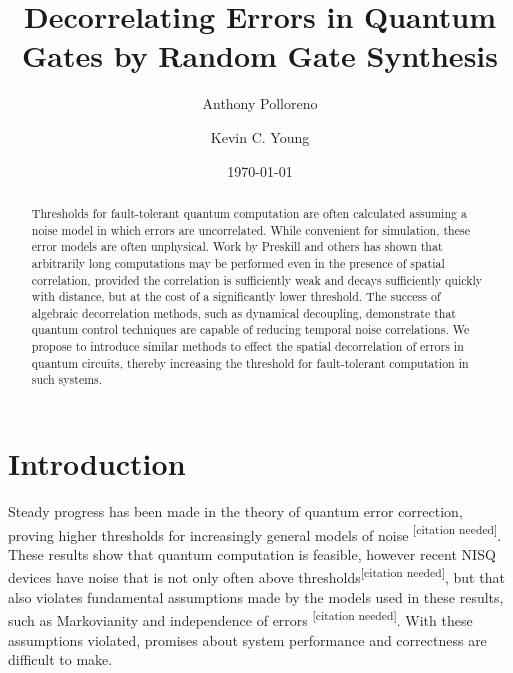 \documentclass[aps,nofootinbib,pra,notitlepage,twocolumn]{revtex4-1}
\newcommand{\needcite}{{\color{blue}\textsuperscript{[citation needed]}}}
\begin{document}
\title{Decorrelating Errors in Quantum Gates by Random Gate Synthesis}

\author{Anthony Polloreno}

\author{Kevin C. Young}

\date{\today}

\begin{abstract}
Thresholds for fault-tolerant quantum computation are often calculated assuming a noise model in which errors are uncorrelated. While convenient for simulation, these error models are often unphysical. Work by Preskill and others has shown that arbitrarily long computations may be performed even in the presence of spatial correlation, provided the correlation is sufficiently weak and decays sufficiently quickly with distance, but at the cost of a significantly lower threshold. The success of algebraic decorrelation methods, such as dynamical decoupling, demonstrate that quantum control techniques are capable of reducing temporal noise correlations. We propose to introduce similar methods to effect the spatial decorrelation of errors in quantum circuits, thereby increasing the threshold for fault-tolerant computation in such systems.
\end{abstract}

\pacs{}

\maketitle

\section{Introduction}

Steady progress has been made in the theory of quantum error correction, proving higher thresholds for increasingly general models of noise \cite{Aharonov2006}\needcite. These results show that quantum computation is feasible, however recent NISQ \cite{Preskill2018} devices have noise that is not only often above thresholds\needcite, but that also violates fundamental assumptions made by the models used in these results, such as Markovianity \cite{Kitaev1997} and independence of errors \needcite. With these assumptions violated, promises about system performance and correctness are difficult to make.
\end{document}

